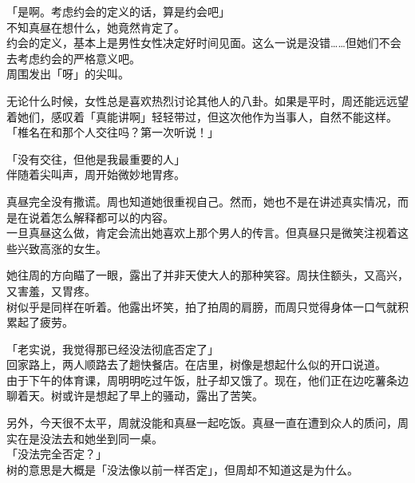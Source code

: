 「是啊。考虑约会的定义的话，算是约会吧」\\

不知真昼在想什么，她竟然肯定了。\\

约会的定义，基本上是男性女性决定好时间见面。这么一说是没错……但她们不会去考虑约会的严格意义吧。\\

周围发出「呀」的尖叫。

无论什么时候，女性总是喜欢热烈讨论其他人的八卦。如果是平时，周还能远远望着她们，感叹着「真能讲啊」轻轻带过，但这次他作为当事人，自然不能这样。\\

「椎名在和那个人交往吗？第一次听说！」

「没有交往，但他是我最重要的人」\\

伴随着尖叫声，周开始微妙地胃疼。

真昼完全没有撒谎。周也知道她很重视自己。然而，她也不是在讲述真实情况，而是在说着怎么解释都可以的内容。\\

一旦真昼这么做，肯定会流出她喜欢上那个男人的传言。但真昼只是微笑注视着这些兴致高涨的女生。

她往周的方向瞄了一眼，露出了并非天使大人的那种笑容。周扶住额头，又高兴，又害羞，又胃疼。\\

树似乎是同样在听着。他露出坏笑，拍了拍周的肩膀，而周只觉得身体一口气就积累起了疲劳。\\

\vspace{2\baselineskip}

「老实说，我觉得那已经没法彻底否定了」\\

回家路上，两人顺路去了趟快餐店。在店里，树像是想起什么似的开口说道。\\

由于下午的体育课，周明明吃过午饭，肚子却又饿了。现在，他们正在边吃薯条边聊着天。树或许是想起了早上的骚动，露出了苦笑。

另外，今天很不太平，周就没能和真昼一起吃饭。真昼一直在遭到众人的质问，周实在是没法去和她坐到同一桌。\\

「没法完全否定？」\\

树的意思是大概是「没法像以前一样否定」，但周却不知道这是为什么。\\


